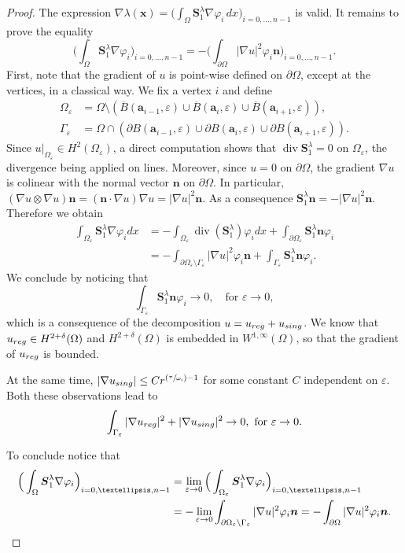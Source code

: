 \documentclass[11pt]{article}
\numberwithin{equation}{section}\newtheorem*{jepEnonce}{\jepEnonceTitle}\newenvironment{enonce*}[1]{\def\jepEnonceTitle{#1}\jepEnonce}{\endjepEnonce}\newtheorem*{conj*}{Conjecture}
\let\ra\to
\newcommand{\Psfrac}[2]{(\sfrac{#1}{#2})}
\theoremstyle{plain}
\theoremstyle{definition}
\newcommand{\di}{\operatorname{div}}
\newcommand{\bo}[1]{{\boldsymbol#1}}
\newcommand{\reg}{\textup{reg}}
\newcommand{\sing}{\textup{sing}}
\newcommand{\vps}{\varepsilon}
\newcommand{\Om}{\Omega}
\newcommand{\om}{\omega}
\newcommand{\vphi}{\varphi}
\newcommand{\sm}{\setminus}
\newcommand{\ov}{\overline}
\let\jepOriginalSfrac\sfrac
\renewcommand{\sfrac}[2]{{\jepOriginalSfrac{#1}{#2}}}
\begin{document}
\begin{proof}
The expression
$\nabla \lambda(\bo x) = \big (\int_\Omega \bo S_1^\lambda \nabla \varphi_i\, dx\big)_{i=0,\dots,n-1}$ is valid. It remains to prove the equality
\[
\Big (\int_\Omega \bo S_1^\lambda \nabla \varphi_i\Big)_{i=0,\dots,n-1}= -\Big (\int_{\partial \Omega} |\nabla u|^2 \varphi_i \bo n\Big)_{i=0,\dots,n-1}.
\]
First, note that the gradient of $u$ is point-wise defined on $\partial \Om$, except at the vertices, in a classical way. We fix a vertex $i$ and define
\begin{align*}
\Om_\vps&= \Om \setminus (\ov B(\bo a_{i-1}, \vps) \cup \ov B(\bo a_{i}, \vps)\cup \ov B(\bo a_{i+1}, \vps)),
\\
\Gamma_\vps&= \Om \cap (\partial B(\bo a_{i-1}, \vps) \cup \partial B(\bo a_{i}, \vps)\cup \partial B(\bo a_{i+1}, \vps)).
\end{align*}
Since $u|_{\Om_
\vps} \in H^2(\Om_\vps)$, a direct computation shows that $\di \bo S_1^\lambda=0$ on $\Omega_\varepsilon$, the divergence being applied on lines. Moreover, since $u=0$ on $\partial \Omega$, the gradient $\nabla u$ is colinear with the normal vector $\bo n$ on $\partial \Omega$. In particular, $(\nabla u \otimes \nabla u) \bo n = (\bo n \cdot \nabla u) \nabla u = |\nabla u |^2 \bo n$. As a consequence $\bo S_1^\lambda \bo n = -|\nabla u|^2 \bo n$. Therefore we obtain
\begin{align*}
\int_{\Omega_\varepsilon} \bo S_1^\lambda \nabla \varphi_i dx &= -\int_{\Omega_\varepsilon} \di (\bo S_1^\lambda) \varphi_i dx +\int_{\partial \Omega_\varepsilon} \bo S_1^\lambda \bo n \varphi_i \\
&= -\int_{\partial \Omega_\varepsilon \setminus \Gamma_\varepsilon} |\nabla u|^2 \varphi_i \bo n + \int_{\Gamma_\varepsilon} \bo S_1^\lambda \bo n \varphi_i.
\end{align*}
We conclude by noticing that
\[
\int_{ \Gamma_\vps} \bo S_1^\lambda \bo n \varphi_i \to 0, \quad\text{for } \vps \ra 0,
\]
which is a consequence of the decomposition $u=u_{\reg}+u_{\sing}$. We know that $u_{\reg} \in H^{2+\delta} (\Om)$ and
$H^{2+\delta} (\Om)$ is embedded in $W^{1, \infty} (\Om)$, so that the gradient of $u_{\reg} $ is bounded.

At the same time, $|\nabla u_{\sing}|\le C r^{\Psfrac{\pi}{\om_i} -1}$ for some constant $C$ independent on $\vps$. Both these observations lead to
\[
\int_{ \Gamma_\vps} |\nabla u_{\reg}|^2 + |\nabla u_{\sing}|^2 \ra 0, \mbox{ for } \vps \ra 0.
\]

To conclude notice that
\begin{align*}
\Big (\int_\Omega \bo S_1^\lambda \nabla \varphi_i\Big)_{i=0,\dots,n-1}&= \lim_{\vps \ra 0} \Big (\int_{\Omega_\vps} \bo S_1^\lambda \nabla \varphi_i\Big)_{i=0,\dots,n-1}\\
&= - \lim_{\vps \ra 0} \int_{\partial \Om_\vps\sm \Gamma_\vps} |\nabla u|^2 \vphi_i \bo n= -\int_{\partial \Om} |\nabla u|^2 \vphi_i\bo n.\qedhere
\end{align*}
\end{proof}
\end{document}
